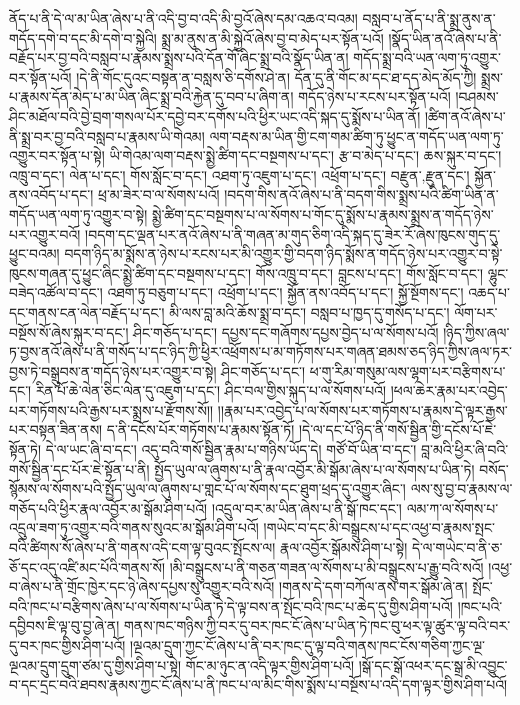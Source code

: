 ནོད་པ་ནི་དེ་ལ་མ་ཡིན་ཞེས་པ་ནི་འདི་བྱ་བ་འདི་མི་བྱའོ་ཞེས་དམ་འཆའ་བའམ། བསླབ་པ་ནོད་པ་ནི་སྨྲ་ནུས་ན་གདོད་དགེ་བ་དང་མི་དགེ་བ་སྐྱེའི། སྨྲ་མ་ནུས་ན་མི་སྐྱེའོ་ཞེས་བྱ་བ་མེད་པར་སྟོན་པའོ། །སྣོད་ཡིན་ནའོ་ཞེས་པ་ནི་བརྗོད་པར་བྱ་བའི་བསླབ་པ་རྣམས་སྨྲས་པའི་དོན་གོ་ཞིང་སྨྲ་བའི་སྣོད་ཡིན་ན། གདོད་སྨྲ་བའི་ཡན་ལག་ཏུ་འགྱུར་བར་སྟོན་པའོ། །དེ་ནི་གོང་དུའང་བསྟན་ན་བསླས་ཅི་དགོས་ཤེ་ན། དོན་དུ་ནི་གོང་མ་དང་ཐ་དད་མེད་མོད་ཀྱི། སྨྲས་པ་རྣམས་དོན་མེད་པ་མ་ཡིན་ཞིང་སྨྲ་བའི་རྐྱེན་དུ་བབ་པ་ཞིག་ན། གདོད་ཉེས་པ་རངས་པར་སྟོན་པའོ། །བཤམས་ཤིང་མཐོལ་བའི་བྱེ་བྲག་གསལ་པོར་དབྱེ་བར་དགོས་པའི་ཕྱིར་ཡང་འདི་སྐད་དུ་སྨོས་པ་ཡིན་ནོ། །ཚིག་ནའོ་ཞེས་པ་ནི་སྨྲ་བར་བྱ་བའི་བསླབ་པ་རྣམས་ཡི་གེའམ། ལག་བརྡས་མ་ཡིན་གྱི་ངག་གམ་ཚིག་ཏུ་ཕྱུང་ན་གདོད་ཡན་ལག་ཏུ་འགྱུར་བར་སྟོན་པ་སྟེ། ཡི་གེའམ་ལག་བརྡས་སྨྱེ་ཚིག་དང་བསྔགས་པ་དང་། རྩ་བ་མེད་པ་དང་། ཆས་སྐུར་བ་དང་། འཁྲུ་བ་དང་། ལེན་པ་དང་། གོས་སློང་བ་དང་། འཐག་ཏུ་འཇུག་པ་དང་། འཕྲོག་པ་དང་། {བརྫུན་,རྫུན་}དང་། སྐྱོན་ནས་འབོད་པ་དང་། ཕྲ་མ་ཟེར་བ་ལ་སོགས་པའོ། །བདག་གིས་ནའོ་ཞེས་པ་ནི་བདག་གིས་སྨྲས་པའི་ཚིག་ཡིན་ན་གདོད་ཡན་ལག་ཏུ་འགྱུར་བ་སྟེ། སྨྱེ་ཚིག་དང་བསྔགས་པ་ལ་སོགས་པ་གོང་དུ་སྨོས་པ་རྣམས་སྨྲས་ན་གདོད་ཉེས་པར་འགྱུར་བའོ། །བདག་དང་ལྡན་པར་ནའོ་ཞེས་པ་ནི་གཞན་མ་གུད་ཅིག་འདི་སྐད་དུ་ཟེར་རོ་ཞེས་ཁུངས་གུད་དུ་ཕྱུང་བའམ། བདག་ཉིད་མ་སྨོས་ན་ཉེས་པ་རངས་པར་མི་འགྱུར་གྱི་བདག་ཉིད་སྨོས་ན་གདོད་ཉེས་པར་འགྱུར་བ་སྟེ་ཁུངས་གཞན་དུ་ཕྱུང་ཞིང་སྨྱེ་ཚིག་དང་བསྔགས་པ་དང་། གོས་འཁྲུ་བ་དང་། བླངས་པ་དང་། གོས་སློང་བ་དང་། ལྷུང་བཟེད་འཚོལ་བ་དང་། འཐག་ཏུ་བཅུག་པ་དང་། འཕྲོག་པ་དང་། སྐྱོན་ནས་འབོད་པ་དང་། སྐྱོ་སྔོགས་དང་། འཆད་པ་དང་གནས་ངན་ལེན་བརྗོད་པ་དང་། མི་ལས་བླ་མའི་ཆོས་སྨྲ་བ་དང་། བསླབ་པ་ཁྱད་དུ་གསོད་པ་དང་། ལོག་པར་བསྔོས་སོ་ཞེས་སྐུར་བ་དང་། ཤིང་གཅོད་པ་དང་། དཔྱས་དང་གཞོགས་དཔྱས་བྱེད་པ་ལ་སོགས་པའོ། །ཉིད་ཀྱིས་ཞལ་ཏ་བྱས་ནའོ་ཞེས་པ་ནི་གསོད་པ་དང་ཉིད་ཀྱི་ཕྱིར་འཕྲོགས་པ་མ་གཏོགས་པར་གཞན་ཐམས་ཅད་ཉིད་ཀྱིས་ཞལ་ཏར་བྱས་ཏེ་བསྒྲུབས་ན་གདོད་ཉེས་པར་འགྱུར་བ་སྟེ། ཤིང་གཅོད་པ་དང་། ཕ་གུ་རིམ་གསུམ་ལས་ལྷག་པར་བརྩིགས་པ་དང་། རིན་པོ་ཆེ་ལེན་ཅིང་ལེན་དུ་འཇུག་པ་དང་། ཤིང་བལ་གྱིས་སྐུད་པ་ལ་སོགས་པའོ། །ཕལ་ཆེར་རྣམ་པར་འབྱེད་པར་གཏོགས་པའི་རྒྱས་པར་སྨྲས་པ་རྫོགས་སོ།། །།རྣམ་པར་འབྱེད་པ་ལ་སོགས་པར་གཏོགས་པ་རྣམས་དེ་ལྟར་རྒྱས་པར་བསྟན་ཟིན་ནས། ད་ནི་དངོས་པོར་གཏོགས་པ་རྣམས་སྟོན་ཏོ། །དེ་ལ་དང་པོ་ཉིད་ནི་གསོ་སྦྱིན་གྱི་དངོས་པོ་ཇེ་སྟོན་ཏེ། དེ་ལ་ཡང་ཞི་བ་དང་། འདུ་བའི་གསོ་སྦྱིན་རྣམ་པ་གཉིས་ཡོད་དེ། གཙོ་བོ་ཡིན་བ་དང་། བླ་མའི་ཕྱིར་ཞི་བའི་གསོ་སྦྱིན་དང་པོར་ཇེ་སྟོན་པ་ནི། སྤྱོད་ཡུལ་ལ་ཞུགས་པ་ནི་རྣལ་འབྱོར་མི་སྒོམ་ཞེས་པ་ལ་སོགས་པ་ཡིན་ཏེ། བསོད་སྙོམས་ལ་སོགས་པའི་སྤྱོད་ཡུལ་ལ་ཞུགས་པ་གླང་པོ་ལ་སོགས་དང་ཐུག་ཕྲད་དུ་འགྱུར་ཞིང་། ལས་སུ་བྱ་བ་རྣམས་ལ་གཅོད་པའི་ཕྱིར་རྣལ་འབྱོར་མ་སྒོམ་ཤིག་པའོ། །འདྲུལ་བར་མ་ཡིན་ཞེས་པ་ནི་སྒོ་ཁང་དང་། ལམ་ཀ་ལ་སོགས་པ་འདྲུལ་ཟག་ཏུ་འགྱུར་བའི་གནས་སུའང་མ་སྒོམ་ཤིག་པའོ། །གཡེང་བ་དང་མི་བསྒྲུངས་པ་དང་འཕྱ་བ་རྣམས་སྤང་བའི་ཚིགས་སོ་ཞེས་པ་ནི་གནས་འདི་ངག་ལྟ་བུའང་སྤོངས་ལ། རྣལ་འབྱོར་སྒོམས་ཤིག་པ་སྟེ། དེ་ལ་གཡེང་བ་ནི་ཅ་ཅོ་དང་འདུ་འཛི་མང་པོའི་གནས་སོ། །མི་བསྒྲུངས་པ་ནི་གཅན་གཟན་ལ་སོགས་པ་མི་བསྒྲུངས་པ་རྒྱུ་བའི་སའོ། །འཕྱ་བ་ཞེས་པ་ནི་གྲོང་ཁྱེར་དང་ཉེ་ཞེས་དཔྱས་སུ་འགྱུར་བའི་སའོ། །གནས་དེ་དག་བཀོལ་ནས་གར་སྒོམ་ཞེ་ན། སྤོང་བའི་ཁང་པ་བརྩིགས་ཞེས་པ་ལ་སོགས་པ་ཡིན་ཏེ་དེ་ལྟ་བས་ན་སྤོང་བའི་ཁང་པ་ཆེད་དུ་གྱིས་ཤིག་པའོ། །ཁང་པའི་དབྱིབས་ཇི་ལྟ་བུ་བྱ་ཞེ་ན། གནས་ཁང་གཉིས་ཀྱི་བར་དུ་བར་ཁང་ངོ་ཞེས་པ་ཡིན་ཏེ་ཁང་བུ་ཕར་ལྟ་ཚུར་ལྟ་བའི་བར་དུ་བར་ཁང་གྱིས་ཤིག་པའོ། །ལྔའམ་དྲུག་ཀྱང་ངོ་ཞེས་པ་ནི་བར་ཁང་དུ་ལྟ་བའི་གནས་ཁང་ངོས་གཅིག་ཀྱང་ལྔ་ལྔའམ་དྲུག་དྲུག་ཙམ་དུ་གྱིས་ཤིག་པ་སྟེ། གོང་མ་ཉུང་ན་འདི་ལྟར་གྱིས་ཤིག་པའོ། །སྒོ་དང་སྒོ་འཕར་དང་སྒྲ་མི་འབྱུང་བ་དང་དྲང་བའི་ཐབས་རྣམས་ཀྱང་ངོ་ཞེས་པ་ནི་ཁང་པ་ལ་མིང་གིས་སྨོས་པ་བསྔོས་པ་འདི་དག་ལྟར་གྱིས་ཤིག་པའོ། 